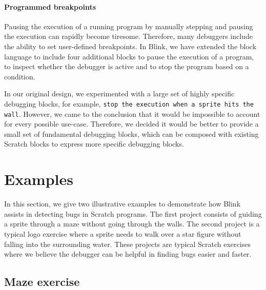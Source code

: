 \documentclass[../main]{subfiles}
\begin{document}
\paragraph{Programmed breakpoints}
Pausing the execution of a running program by manually stepping and pausing the execution can rapidly become tiresome.
Therefore, many debuggers include the ability to set user-defined breakpoints.
In Blink, we have extended the block language to include four additional blocks to pause the execution of a program, to inspect whether the debugger is active and to stop the program based on a condition.

In our original design, we experimented with a large set of highly specific debugging blocks, for example, \texttt{stop the execution when a sprite hits the wall}.
However, we came to the conclusion that it would be impossible to account for every possible use-case.
Therefore, we decided it would be better to provide a small set of fundamental debugging blocks, which can be composed with existing Scratch blocks to express more specific debugging blocks.

\section{Examples}\label{sec:blink-illustrative-examples}

In this section, we give two illustrative examples to demonstrate how Blink assists in detecting bugs in Scratch programs.
The first project consists of guiding a sprite through a maze without going through the walls.
The second project is a typical logo exercise where a sprite needs to walk over a star figure without falling into the surrounding water.
These projects are typical Scratch exercises where we believe the debugger can be helpful in finding bugs easier and faster.

\subsection{Maze exercise}\label{subsec:maze-exercise}
\end{document}
